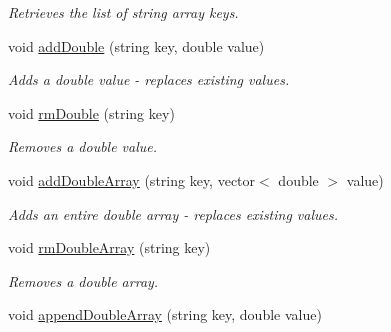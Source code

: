\begin{DoxyCompactItemize}
\begin{DoxyCompactList}\small\item\em Retrieves the list of string array keys. \end{DoxyCompactList}\item 
\hypertarget{class_rules_1_1_rules_entry_ac6875f0e8bee95f89e9250265216f840}{void \hyperlink{class_rules_1_1_rules_entry_ac6875f0e8bee95f89e9250265216f840}{add\-Double} (string key, double value)}\label{class_rules_1_1_rules_entry_ac6875f0e8bee95f89e9250265216f840}

\begin{DoxyCompactList}\small\item\em Adds a double value -\/ replaces existing values. \end{DoxyCompactList}\item 
\hypertarget{class_rules_1_1_rules_entry_a100e407a7600f99a7e7b69b48826bab3}{void \hyperlink{class_rules_1_1_rules_entry_a100e407a7600f99a7e7b69b48826bab3}{rm\-Double} (string key)}\label{class_rules_1_1_rules_entry_a100e407a7600f99a7e7b69b48826bab3}

\begin{DoxyCompactList}\small\item\em Removes a double value. \end{DoxyCompactList}\item 
\hypertarget{class_rules_1_1_rules_entry_a34739f30a0eaf51e0b2b3fdd23ebf2b1}{void \hyperlink{class_rules_1_1_rules_entry_a34739f30a0eaf51e0b2b3fdd23ebf2b1}{add\-Double\-Array} (string key, vector$<$ double $>$ value)}\label{class_rules_1_1_rules_entry_a34739f30a0eaf51e0b2b3fdd23ebf2b1}

\begin{DoxyCompactList}\small\item\em Adds an entire double array -\/ replaces existing values. \end{DoxyCompactList}\item 
\hypertarget{class_rules_1_1_rules_entry_ae53af0f8a3313cf037fd79b2973b4fbd}{void \hyperlink{class_rules_1_1_rules_entry_ae53af0f8a3313cf037fd79b2973b4fbd}{rm\-Double\-Array} (string key)}\label{class_rules_1_1_rules_entry_ae53af0f8a3313cf037fd79b2973b4fbd}

\begin{DoxyCompactList}\small\item\em Removes a double array. \end{DoxyCompactList}\item 
\hypertarget{class_rules_1_1_rules_entry_ab882212f0e6a5ee166f6786aa0f20aa3}{void \hyperlink{class_rules_1_1_rules_entry_ab882212f0e6a5ee166f6786aa0f20aa3}{append\-Double\-Array} (string key, double value)}\label{class_rules_1_1_rules_entry_ab882212f0e6a5ee166f6786aa0f20aa3}


\end{DoxyCompactItemize}
